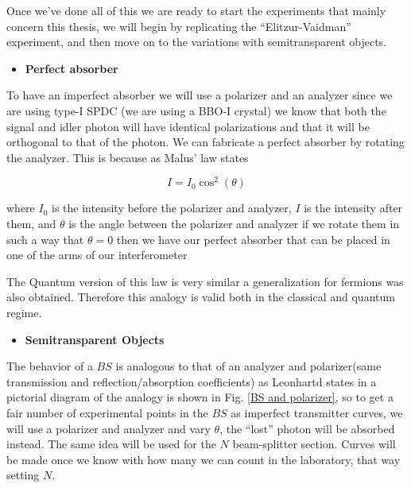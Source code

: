 \documentclass[12pt]{book}
\begin{document}
Once we've done all of this we are ready to start the experiments that mainly concern this thesis, we will begin by replicating the ``Elitzur-Vaidman'' experiment, and then move on to the variations with semitransparent objects.


\begin{itemize}
\item {\large \textbf{Perfect absorber}}
\end{itemize}
To have an imperfect absorber we will use a polarizer and an analyzer since we are using type-I SPDC (we are using a BBO-I crystal) we know that both the signal and idler photon will have identical polarizations and that it will be orthogonal to that of the photon. We can fabricate a perfect absorber by rotating the analyzer. This is because as Malus' law states \cite{hecht}

\begin{equation}
I=I_{0} \cos^{2}(\theta)
\end{equation}

where $I_{0}$ is the intensity before the polarizer and analyzer, $I$ is the intensity after them, and $\theta$ is the angle between the polarizer and analyzer if we rotate them in such a way that $\theta=0$ then we have our perfect absorber that can be placed in one of the arms of our interferometer


The Quantum version of this law is very similar \cite{malus} a generalization for fermions was also obtained. Therefore this analogy is valid both in the classical and quantum regime.
 \begin{itemize}
\item {\large \textbf{Semitransparent Objects}}
\end{itemize}

The behavior of a $BS$ is analogous to that of an analyzer and polarizer(same transmission and reflection/absorption coefficients) as Leonhartd states in \cite{Leonhardt_2003} a pictorial diagram of the analogy is shown in Fig. \ref{BS and polarizer}, so to get a fair number of experimental points in the $BS$ as imperfect transmitter curves, we will use a polarizer and analyzer and vary $\theta$, the ``lost'' photon will be absorbed instead. The same idea will be used for the $N$ beam-splitter section. Curves will be made once we know with how many we can count in the laboratory, that way setting $N$.
\end{document}
